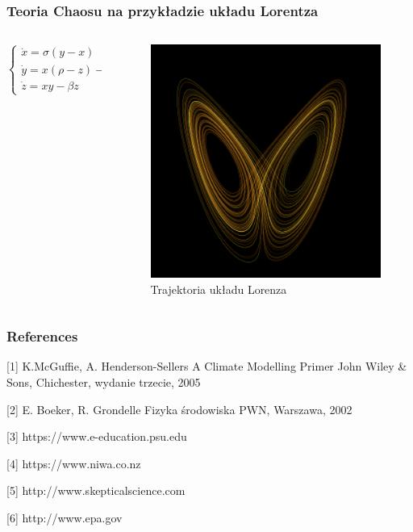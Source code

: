 \documentclass{beamer}
\begin{document}
\begin{frame}
	\frametitle{Teoria Chaosu na przykładzie układu Lorentza}
	\begin{columns}
		\begin{column}{0.5\textwidth}	
			$\begin{cases} \dot{x} = \sigma(y-x)\\ \dot{y} =x(\rho-z)-y \\ \dot{z} = xy-\beta z \end{cases}$
		\end{column}
		\begin{column}{0.5\textwidth}
			\begin{figure}[h]
				\begin{center}
					\includegraphics[width=0.7\linewidth]{images/motyl.png}
					\caption{Trajektoria układu Lorenza}
				\end{center}
			\end{figure}
		\end{column}
		
	\end{columns}
	
\end{frame}



\begin{frame}
	\frametitle{References}
	\footnotesize{
		\begin{thebibliography}{99} %
			[1] K.McGuffie, A. Henderson-Sellers
			\newblock A Climate Modelling Primer
			\newblock John Wiley \& Sons, Chichester, wydanie trzecie, 2005
			
			[2] E. Boeker, R. Grondelle
			\newblock Fizyka środowiska
			\newblock PWN, Warszawa, 2002
			
			[3] https://www.e-education.psu.edu
			
			[4] https://www.niwa.co.nz
			
			[5] http://www.skepticalscience.com
			
			[6] http://www.epa.gov
			
		\end{thebibliography}
	}
\end{frame}
\end{document}
